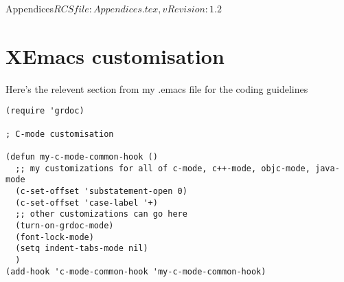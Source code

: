 %   

\begin{cactuspart}{10}{Appendices}{$RCSfile: Appendices.tex,v $}{$Revision: 1.2 $}
\renewcommand{\thepage}{\Alph{part}\arabic{page}}

\chapter{XEmacs customisation}

Here's the relevent section from my .emacs file for the coding guidelines

\begin{verbatim}
(require 'grdoc)

; C-mode customisation

(defun my-c-mode-common-hook ()
  ;; my customizations for all of c-mode, c++-mode, objc-mode, java-mode
  (c-set-offset 'substatement-open 0)
  (c-set-offset 'case-label '+)
  ;; other customizations can go here
  (turn-on-grdoc-mode)
  (font-lock-mode)
  (setq indent-tabs-mode nil)
  )
(add-hook 'c-mode-common-hook 'my-c-mode-common-hook)
\end{verbatim}


\end{cactuspart}
